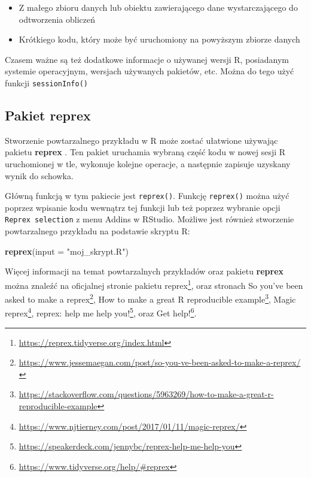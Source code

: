\documentclass[paper=6in:9in,pagesize=pdftex,headinclude=on,footinclude=on,10pt]{scrbook}
\newenvironment{Shaded}{\begin{snugshade}}{\end{snugshade}}
\newcommand{\DataTypeTok}[1]{\textcolor[rgb]{0.13,0.29,0.53}{#1}}
\newcommand{\KeywordTok}[1]{\textcolor[rgb]{0.13,0.29,0.53}{\textbf{#1}}}
\newcommand{\NormalTok}[1]{#1}
\newcommand{\StringTok}[1]{\textcolor[rgb]{0.31,0.60,0.02}{#1}}
\DeclareRobustCommand{\href}[2]{#2\footnote{\url{#1}}}
\providecommand{\tightlist}{%
  \setlength{\itemsep}{0pt}\setlength{\parskip}{0pt}}
\begin{document}
\begin{itemize}
\tightlist
\item
  Z małego zbioru danych lub obiektu zawierającego dane wystarczającego do odtworzenia obliczeń
\item
  Krótkiego kodu, który może być uruchomiony na powyższym zbiorze danych
\end{itemize}

Czasem ważne są też dodatkowe informacje o używanej wersji R, posiadanym systemie operacyjnym, wersjach używanych pakietów, etc.
Można do tego użyć funkcji \texttt{sessionInfo()}

\hypertarget{pakiet-reprex}{%
\subsection{\texorpdfstring{Pakiet \textbf{reprex}}{Pakiet reprex}}\label{pakiet-reprex}}

Stworzenie powtarzalnego przykładu w R może zostać ułatwione używając pakietu \textbf{reprex} \citep{R-reprex}.
Ten pakiet uruchamia wybraną część kodu w nowej sesji R uruchomionej w tle, wykonuje kolejne operacje, a następnie zapisuje uzyskany wynik do schowka.

Główną funkcją w tym pakiecie jest \texttt{reprex()}.
Funkcję \texttt{reprex()} można użyć poprzez wpisanie kodu wewnątrz tej funkcji lub też poprzez wybranie opcji \texttt{Reprex\ selection} z menu Addins w RStudio.
Możliwe jest również stworzenie powtarzalnego przykładu na podstawie skryptu R:

\begin{Shaded}
\begin{Highlighting}[]
\KeywordTok{reprex}\NormalTok{(}\DataTypeTok{input =} \StringTok{"moj_skrypt.R"}\NormalTok{)}
\end{Highlighting}
\end{Shaded}

Więcej informacji na temat powtarzalnych przykładów oraz pakietu \textbf{reprex} można znaleźć na \href{https://reprex.tidyverse.org/index.html}{oficjalnej stronie pakietu reprex}, oraz stronach \href{https://www.jessemaegan.com/post/so-you-ve-been-asked-to-make-a-reprex/}{So you've been asked to make a reprex}, \href{https://stackoverflow.com/questions/5963269/how-to-make-a-great-r-reproducible-example}{How to make a great R reproducible example}, \href{https://www.njtierney.com/post/2017/01/11/magic-reprex/}{Magic reprex}, \href{https://speakerdeck.com/jennybc/reprex-help-me-help-you}{reprex: help me help you!}, oraz \href{https://www.tidyverse.org/help/\#reprex}{Get help!}.
\end{document}
